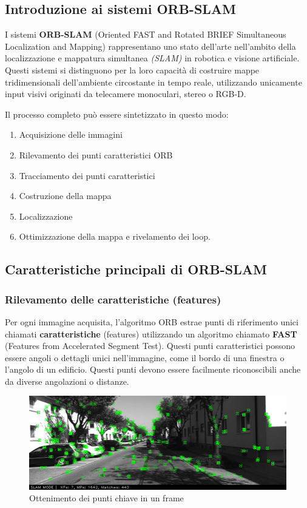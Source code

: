 \documentclass[12pt,a4paper]{report}
\begin{document}
\subsection{Introduzione ai sistemi ORB-SLAM}

I sistemi \textbf{ORB-SLAM} (Oriented FAST and Rotated BRIEF Simultaneous Localization and Mapping) rappresentano uno stato dell'arte nell'ambito della localizzazione e mappatura simultanea \textit{(SLAM)} in robotica e visione artificiale. Questi sistemi si distinguono per la loro capacità di costruire mappe tridimensionali dell'ambiente circostante in tempo reale, utilizzando unicamente input visivi originati da telecamere monoculari, stereo o RGB-D.

Il processo completo può essere sintetizzato in questo modo:

\begin{enumerate}
    \item Acquisizione delle immagini
    \item Rilevamento dei punti caratteristici ORB
    \item Tracciamento dei punti caratteristici
    \item Costruzione della mappa
    \item Localizzazione
    \item Ottimizzazione della mappa e rivelamento dei loop.
\end{enumerate}

\subsection{Caratteristiche principali di ORB-SLAM}

\subsubsection{Rilevamento delle caratteristiche (features)}
Per ogni immagine acquisita, l'algoritmo ORB estrae punti di riferimento unici chiamati \textbf{caratteristiche} (features) utilizzando un algoritmo chiamato \textbf{FAST} (Features from Accelerated Segment Test). 
Questi punti caratteristici possono essere angoli o dettagli unici nell'immagine, come il bordo di una finestra o l'angolo di un edificio. Questi punti devono essere facilmente riconoscibili anche da diverse angolazioni o distanze.


\begin{figure}[h]
    \centering
    \includegraphics[width=1\linewidth]{img/ORB_SLAM2_feature.png}
    \caption{Ottenimento dei punti chiave in un frame \cite{SLAM2_Feature}}
\end{figure}
\end{document}
